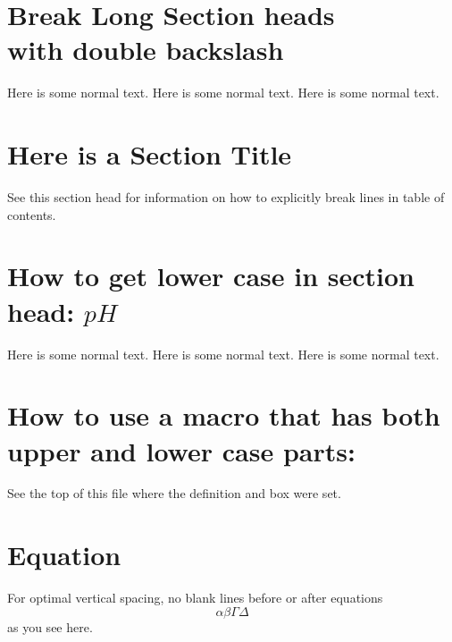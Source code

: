 \section[This Version of Section Head will be sent Contents]
{Break Long Section heads\\ with double backslash}
Here is some normal text.
Here is some normal text.
Here is some normal text.

 \section[This show how to explicitly break lines
\string\hfill\string\break\space in Table of Contents]
{Here is a Section Title}
See this section head for information on how to explicitly break lines in
table of contents.

\section{How to get \lowercase{lower case} in section head: \lowercase{$p$}$H$}
Here is some normal text.
Here is some normal text.
Here is some normal text.

\section{How to use a macro that has both upper and lower case parts:
\copy\sectsavebox}
See the top of this file where the definition and box were set.


\section{Equation}

For optimal vertical spacing, no blank lines before or after
equations
\begin{equation}
\alpha\beta\Gamma\Delta
\end{equation}
as you see here.
